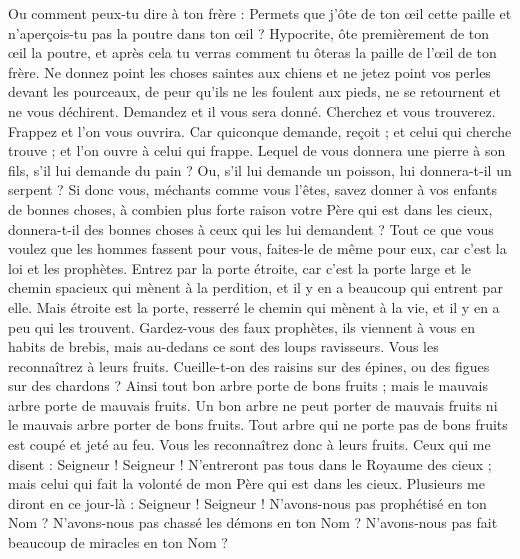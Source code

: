 \begin{multicols}{2}
Ou comment peux-tu dire à ton frère : Permets que j'ôte de ton œil cette paille et n'aperçois-tu pas la poutre dans ton œil ?
Hypocrite, ôte premièrement de ton œil la poutre, et après cela tu verras comment tu ôteras la paille de l'œil de ton frère.
Ne donnez point les choses saintes aux chiens et ne jetez point vos perles devant les pourceaux, de peur qu'ils ne les foulent aux pieds, ne se retournent et ne vous déchirent.
Demandez et il vous sera donné. Cherchez et vous trouverez. Frappez et l'on vous ouvrira.
Car quiconque demande, reçoit ; et celui qui cherche trouve ; et l'on ouvre à celui qui frappe.
Lequel de vous donnera une pierre à son fils, s'il lui demande du pain ?
Ou, s'il lui demande un poisson, lui donnera-t-il un serpent ?
Si donc vous, méchants comme vous l'êtes, savez donner à vos enfants de bonnes choses, à combien plus forte raison votre Père qui est dans les cieux, donnera-t-il des bonnes choses à ceux qui les lui demandent ?
Tout ce que vous voulez que les hommes fassent pour vous, faites-le de même pour eux, car c'est la loi et les prophètes.
Entrez par la porte étroite, car c'est la porte large et le chemin spacieux qui mènent à la perdition, et il y en a beaucoup qui entrent par elle.
Mais étroite est la porte, resserré le chemin qui mènent à la vie, et il y en a peu qui les trouvent.
Gardez-vous des faux prophètes, ils viennent à vous en habits de brebis, mais au-dedans ce sont des loups ravisseurs.
Vous les reconnaîtrez à leurs fruits. Cueille-t-on des raisins sur des épines, ou des figues sur des chardons ?
Ainsi tout bon arbre porte de bons fruits ; mais le mauvais arbre porte de mauvais fruits.
Un bon arbre ne peut porter de mauvais fruits ni le mauvais arbre porter de bons fruits.
Tout arbre qui ne porte pas de bons fruits est coupé et jeté au feu.
Vous les reconnaîtrez donc à leurs fruits.
Ceux qui me disent : Seigneur ! Seigneur ! N'entreront pas tous dans le Royaume des cieux ; mais celui qui fait la volonté de mon Père qui est dans les cieux.
Plusieurs me diront en ce jour-là : Seigneur ! Seigneur ! N'avons-nous pas prophétisé en ton Nom ? N'avons-nous pas chassé les démons en ton Nom ? N'avons-nous pas fait beaucoup de miracles en ton Nom ?

\end{multicols}
